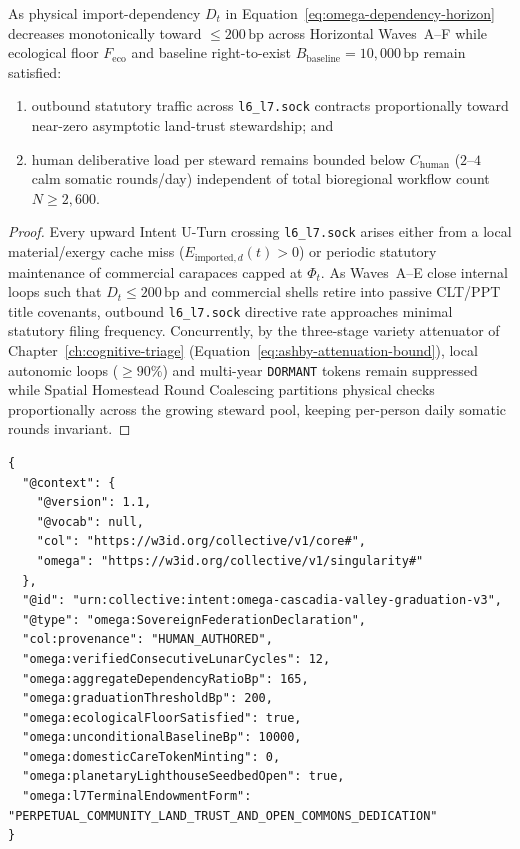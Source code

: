 \begin{theorem}
\label{thm:omega-carapace-contraction}
As physical import-dependency $D_t$ in Equation~\eqref{eq:omega-dependency-horizon} decreases monotonically toward $\le 200\,\mathrm{bp}$ across Horizontal Waves~A--F while ecological floor $F_{\mathrm{eco}}$ and baseline right-to-exist $B_{\mathrm{baseline}} = 10{,}000\,\mathrm{bp}$ remain satisfied:
\begin{enumerate}
    \item outbound statutory traffic across \texttt{l6\_l7.sock} contracts proportionally toward near-zero asymptotic land-trust stewardship; and
    \item human deliberative load per steward remains bounded below $C_{\mathrm{human}}$ ($2\text{--}4$ calm somatic rounds/day) independent of total bioregional workflow count $N \ge 2{,}600$.
\end{enumerate}
\end{theorem}
\begin{proof}
Every upward Intent U-Turn crossing \texttt{l6\_l7.sock} arises either from a local material/exergy cache miss ($E_{\mathrm{imported}, d}(t) > 0$) or periodic statutory maintenance of commercial carapaces capped at $\Phi_t$. As Waves~A--E close internal loops such that $D_t \le 200\,\mathrm{bp}$ and commercial shells retire into passive CLT/PPT title covenants, outbound \texttt{l6\_l7.sock} directive rate approaches minimal statutory filing frequency. Concurrently, by the three-stage variety attenuator of Chapter~\ref{ch:cognitive-triage} (Equation~\ref{eq:ashby-attenuation-bound}), local autonomic loops ($\ge 90\%$) and multi-year \texttt{DORMANT} tokens remain suppressed while Spatial Homestead Round Coalescing partitions physical checks proportionally across the growing steward pool, keeping per-person daily somatic rounds invariant.
\end{proof}

\begin{lstlisting}[language=jsonld,caption={Canonical Wave F \texttt{SovereignFederationDeclaration} attesting $D_t \le 200\,\mathrm{bp}$ across 12 lunar cycles and activating open Planetary Lighthouse seedbed sharing.}]
{
  "@context": {
    "@version": 1.1,
    "@vocab": null,
    "col": "https://w3id.org/collective/v1/core#",
    "omega": "https://w3id.org/collective/v1/singularity#"
  },
  "@id": "urn:collective:intent:omega-cascadia-valley-graduation-v3",
  "@type": "omega:SovereignFederationDeclaration",
  "col:provenance": "HUMAN_AUTHORED",
  "omega:verifiedConsecutiveLunarCycles": 12,
  "omega:aggregateDependencyRatioBp": 165,
  "omega:graduationThresholdBp": 200,
  "omega:ecologicalFloorSatisfied": true,
  "omega:unconditionalBaselineBp": 10000,
  "omega:domesticCareTokenMinting": 0,
  "omega:planetaryLighthouseSeedbedOpen": true,
  "omega:l7TerminalEndowmentForm": "PERPETUAL_COMMUNITY_LAND_TRUST_AND_OPEN_COMMONS_DEDICATION"
}
\end{lstlisting}

